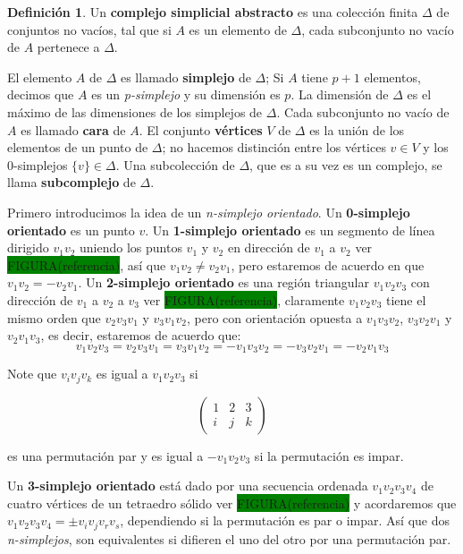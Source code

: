 \documentclass[12pt]{book}
\theoremstyle{definition}
\newtheorem{definition}[theorem]{Definición}
\newcounter{in}
\newcounter{ini}
\begin{document}
\begin{definition}
Un \textbf{complejo simplicial abstracto} es una colección finita
$\Delta$ de conjuntos no vacíos, tal que si $A$ es un elemento de $\Delta$,
cada subconjunto no vacío de $A$ pertenece a $\Delta$.
\end{definition}

El elemento $A$ de $\Delta$ es llamado \textbf{simplejo} de
$\Delta$; Si $A$ tiene $p+1$ elementos, decimos que $A$ es un
\emph{p-simplejo} y su dimensión es $p$. La dimensión de $\Delta$
es el máximo de las dimensiones de los simplejos de $\Delta$. Cada
subconjunto no vacío de $A$ es llamado \textbf{cara} de $A$. El
conjunto \textbf{vértices} $V$ de $\Delta$ es la unión de los
elementos de un punto de $\Delta$; no hacemos distinción entre los
vértices $v\in V$ y los $0$-simplejos $\{v\}\in \Delta$. Una
subcolección de $\Delta$, que es a su vez es un complejo, se llama
\textbf{subcomplejo} de $\Delta$.

Primero introducimos la idea de un \emph{n-simplejo orientado}. Un
\textbf{0-simplejo orientado} es un punto $v$. Un \textbf{1-simplejo
  orientado} es un segmento de línea dirigido $v_{1}v_{2}$ uniendo los
puntos $v_{1}$ y $v_{2}$ en dirección de $v_{1}$ a $v_{2}$ ver \setlength{\fboxsep}{0pt}\colorbox{green}{FIGURA(referencia)}, así que
$v_{1}v_{2}\neq v_{2}v_{1}$, pero estaremos de acuerdo en que
$v_{1}v_{2}=-v_{2}v_{1}$. Un \textbf{2-simplejo orientado} es una
región triangular $v_{1}v_{2}v_{3}$ con dirección de $v_{1}$ a $v_{2}$
a $v_{3}$ ver \setlength{\fboxsep}{0pt}\colorbox{green}{FIGURA(referencia)}, claramente $v_{1}v_{2}v_{3}$ tiene el mismo orden que
$v_{2}v_{3}v_{1}$ y $v_{3}v_{1}v_{2}$, pero con orientación opuesta a
$v_{1}v_{3}v_{2}$, $v_{3}v_{2}v_{1}$ y $v_{2}v_{1}v_{3}$, es decir, estaremos de acuerdo que:
$$v_{1}v_{2}v_{3}=v_{2}v_{3}v_{1}=v_{3}v_{1}v_{2}=-v_{1}v_{3}v_{2}=-v_{3}v_{2}v_{1}=-v_{2}v_{1}v_{3}$$

Note que $v_{i}v_{j}v_{k}$ es igual a $v_{1}v_{2}v_{3}$ si

\[ \left(
  \begin{array}{ccc}
    1 & 2 & 3 \\
    i & j & k 
  \end{array} 
\right)\] 

es una permutación par y es igual a $-v_{1}v_{2}v_{3}$ si la
permutación es impar.

Un \textbf{3-simplejo orientado} está dado por una secuencia ordenada
$v_{1}v_{2}v_{3}v_{4}$ de cuatro vértices de un tetraedro sólido
ver \setlength{\fboxsep}{0pt}\colorbox{green}{FIGURA(referencia)} y
acordaremos que $v_{1}v_{2}v_{3}v_{4}=\pm v_{i}v_{j}v_{r}v_{s}$,
dependiendo si la permutación es par o impar. Así que dos
\emph{n-simplejos}, son equivalentes si difieren el uno del otro
por una permutación par. 
\end{document}
